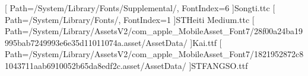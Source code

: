 [
  Path=/System/Library/Fonts/Supplemental/,
  FontIndex=6
]{Songti.ttc}
[
  Path=/System/Library/Fonts/,
  FontIndex=1
]{STHeiti Medium.ttc}
[
  Path=/System/Library/AssetsV2/com_apple_MobileAsset_Font7/28f00a24ba19995bab7249993e6e35d11011074a.asset/AssetData/
]{Kai.ttf}
[
  Path=/System/Library/AssetsV2/com_apple_MobileAsset_Font7/1821952872c81043711aab6910052b65da8edf2c.asset/AssetData/
]{STFANGSO.ttf}
\providecommand*{\songti}{}
\providecommand*{\heiti}{}
\providecommand*{\kaishu}{}
\providecommand*{\fangsong}{}
\renewcommand*{\songti}{\CJKfamily{zhsong}}
\renewcommand*{\heiti}{\CJKfamily{zhhei}}
\renewcommand*{\kaishu}{\CJKfamily{zhkai}}
\renewcommand*{\fangsong}{\CJKfamily{zhfs}}
